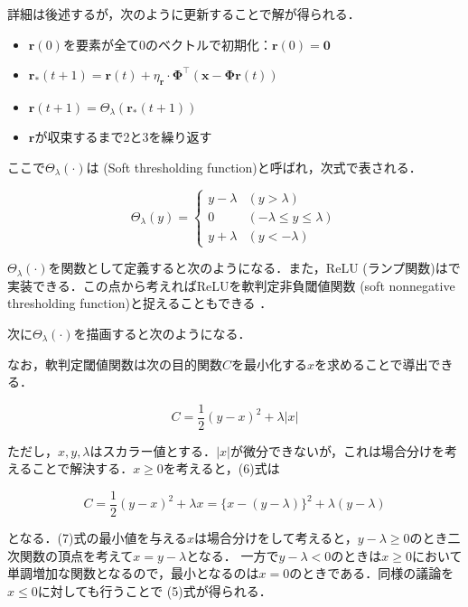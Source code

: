 詳細は後述するが，次のように更新することで解が得られる．

\begin{itemize}
\item $\mathbf{r}(0)$を要素が全て0のベクトルで初期化：$\mathbf{r}(0)=\mathbf{0}$
\item $\mathbf{r}_*(t+1)=\mathbf{r}(t)+\eta_\mathbf{r}\cdot \mathbf{\Phi}^\top(\mathbf{x}-\mathbf{\Phi}\mathbf{r}(t))$
\item $\mathbf{r}(t+1) = \Theta_\lambda(\mathbf{r}_*(t+1))$
\item $\mathbf{r}$が収束するまで2と3を繰り返す
\end{itemize}

ここで$\Theta_\lambda(\cdot)$は\textbf{} (Soft thresholding function)と呼ばれ，次式で表される．


\begin{equation}
\Theta_\lambda(y)= 
\begin{cases} 
y-\lambda & (y>\lambda)\\ 
0 & (-\lambda\leq y\leq\lambda)\\ 
 y+\lambda & (y<-\lambda) 
\end{cases}
\end{equation}


$\Theta_\lambda(\cdot)$を関数として定義すると次のようになる．また，ReLU (ランプ関数)はで実装できる．この点から考えればReLUを軟判定非負閾値関数 (soft nonnegative thresholding function)と捉えることもできる \cite{Papyan2018-yr}．

次に$\Theta_\lambda(\cdot)$を描画すると次のようになる．


なお，軟判定閾値関数は次の目的関数$C$を最小化する$x$を求めることで導出できる．


\begin{equation}
C=\frac{1}{2}(y-x)^2+\lambda |x|
\end{equation}


ただし，$x, y, \lambda$はスカラー値とする．$|x|$が微分できないが，これは場合分けを考えることで解決する．$x\geq 0$を考えると，(6)式は


\begin{equation}
C=\frac{1}{2}(y-x)^2+\lambda x = \{x-(y-\lambda)\}^2+\lambda(y-\lambda)
\end{equation}


となる．(7)式の最小値を与える$x$は場合分けをして考えると，$y-\lambda\geq0$のとき二次関数の頂点を考えて$x=y-\lambda$となる． 一方で$y-\lambda<0$のときは$x\geq0$において単調増加な関数となるので，最小となるのは$x=0$のときである．同様の議論を$x\leq0$に対しても行うことで (5)式が得られる．


